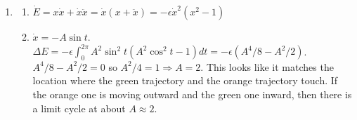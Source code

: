 \documentclass[12pt,letterpaper,noanswers]{exam}
\begin{document}
\begin{enumerate}
\item \begin{enumerate}
    \item 
 $\dot E = x \dot x + \dot x \ddot x = \dot x(x + \ddot x) = -\epsilon \dot x^2(x^2-1)$
 \item $\dot x = -A \sin t$.  $\Delta E = -\epsilon \int_0^{2\pi}A^2\sin^2 t(A^2\cos^2 t - 1)dt = -\epsilon\left(A^4/8 -A^2/2\right)$.  $A^4/8 - A^2/2 = 0$ so $A^2/4  = 1 \Rightarrow A = 2$.  This looks like it matches the location where the green trajectory and the orange trajectory touch.  If the orange one is moving outward and the green one inward, then there is a limit cycle at about $A \approx 2$.
 \end{enumerate}
\end{enumerate}
\end{document}
